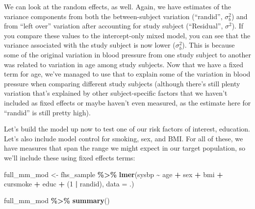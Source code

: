 \documentclass[
]{book}
\newenvironment{Shaded}{\begin{snugshade}}{\end{snugshade}}
\newcommand{\AttributeTok}[1]{\textcolor[rgb]{0.13,0.29,0.53}{#1}}
\newcommand{\DecValTok}[1]{\textcolor[rgb]{0.00,0.00,0.81}{#1}}
\newcommand{\FunctionTok}[1]{\textcolor[rgb]{0.13,0.29,0.53}{\textbf{#1}}}
\newcommand{\NormalTok}[1]{#1}
\newcommand{\OtherTok}[1]{\textcolor[rgb]{0.56,0.35,0.01}{#1}}
\newcommand{\SpecialCharTok}[1]{\textcolor[rgb]{0.81,0.36,0.00}{\textbf{#1}}}
\begin{document}
We can look at the random effects, as well. Again, we have estimates of the
variance components from both the between-subject variation (``randid'', \(\sigma_{b}^2\))
and from ``left over'' variation after accounting for study subject (``Residual'',
\(\sigma^2\)). If you compare these values to the intercept-only mixed model, you
can see that the variance associated with the study subject is now lower (\(\sigma_{b}^2\)).
This is because some of the original variation in blood pressure from one study
subject to another was related to variation in age among study subjects. Now that
we have a fixed term for age, we've managed to use that to explain some of the
variation in blood pressure when comparing different study subjects (although there's
still plenty variation that's explained by other subject-specific factors
that we haven't included as fixed effects or maybe haven't even measured,
as the estimate here for ``randid'' is still pretty high).

Let's build the model up now to test one of our risk factors of interest, education.
Let's also include model control for smoking, sex, and BMI. For all of these,
we have measures that span the range we might expect in our target population,
so we'll include these using fixed effects terms:

\begin{Shaded}
\begin{Highlighting}[]
\NormalTok{full\_mm\_mod }\OtherTok{\textless{}{-}}\NormalTok{ fhs\_sample }\SpecialCharTok{\%\textgreater{}\%} 
  \FunctionTok{lmer}\NormalTok{(sysbp }\SpecialCharTok{\textasciitilde{}}\NormalTok{ age }\SpecialCharTok{+}\NormalTok{ sex }\SpecialCharTok{+}\NormalTok{ bmi }\SpecialCharTok{+}\NormalTok{ cursmoke }\SpecialCharTok{+}\NormalTok{ educ }\SpecialCharTok{+}\NormalTok{ (}\DecValTok{1} \SpecialCharTok{|}\NormalTok{ randid), }
       \AttributeTok{data =}\NormalTok{ .) }

\NormalTok{full\_mm\_mod }\SpecialCharTok{\%\textgreater{}\%} 
  \FunctionTok{summary}\NormalTok{()}
\end{Highlighting}
\end{Shaded}
\end{document}
